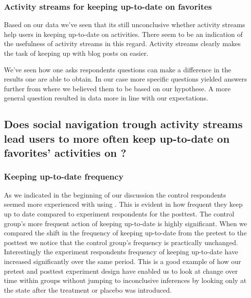 \subsubsection{Activity streams for keeping up-to-date on favorites}

Based on our data we've seen that its still unconclusive whether activity
streams help users in keeping up-to-date on activities. There seem to be an
indication of the usefulness of activity streams in this regard.
Activity streams clearly makes the task of keeping up with blog posts on
\urort{} easier.

We've seen how
one asks respondents questions can make a difference in the results one
are able to obtain. In our case more specific questions yielded answers
further from where we believed them to be based on our hypothese. A more
general question resulted in data more in line with our expectations.

\subsection{%
  Does social navigation trough activity streams lead users to more often keep
  up-to-date on favorites' activities on \urort{}?
}

\subsubsection{Keeping up-to-date frequency}

As we indicated in the beginning of our discussion the control respondents
seemed more experienced with using \urort{}. This is evident in how
frequent they keep up to date compared to experiment respondents for the
posttest.%
The control group's more frequent action of keeping up-to-date is highly
significant. When we compared the shift in the frequency of keeping up-to-date
from the pretest to the posttest%
we notice that the control group's frequency is practically unchanged.
Interestingly the experiment respondents frequency of keeping up-to-date have
increased significantly over the same period. This is a good example
of how our pretest and posttest experiment design have enabled us to look
at change over time within groups without jumping to inconclusive inferences
by looking only at the state after the treatment or placebo was introduced.

